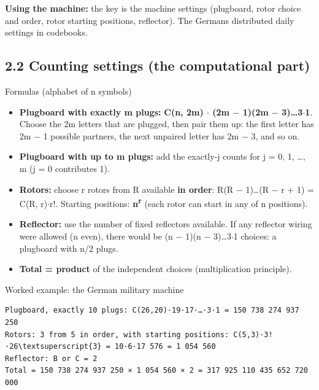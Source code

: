 \documentclass[11pt,a4paper]{article}
\begin{document}
\textbf{Using the machine:} the key is the machine settings (plugboard, rotor choice and order, rotor starting positions, reflector). The Germans distributed daily settings in codebooks.\par
\subsection*{2.2 Counting settings (the computational part)}
\begin{method}{Formulas (alphabet of n symbols)}
\begin{itemize}
\item \textbf{Plugboard with exactly m plugs:} \textbf{C(n, 2m) \ensuremath{\cdot} (2m \ensuremath{-} 1)(2m \ensuremath{-} 3)\ldots{}3\ensuremath{\cdot}1}. Choose the 2m letters that are plugged, then pair them up: the first letter has 2m \ensuremath{-} 1 possible partners, the next unpaired letter has 2m \ensuremath{-} 3, and so on.
\item \textbf{Plugboard with up to m plugs:} add the exactly-j counts for j = 0, 1, \ldots{}, m (j = 0 contributes 1).
\item \textbf{Rotors:} choose r rotors from R available \textbf{in order}: R(R \ensuremath{-} 1)\ldots{}(R \ensuremath{-} r + 1) = C(R, r)\ensuremath{\cdot}r!. Starting positions: \textbf{n\textsuperscript{r}} (each rotor can start in any of n positions).
\item \textbf{Reflector:} use the number of fixed reflectors available. If any reflector wiring were allowed (n even), there would be (n \ensuremath{-} 1)(n \ensuremath{-} 3)\ldots{}3\ensuremath{\cdot}1 choices: a plugboard with n/2 plugs.
\item \textbf{Total = product} of the independent choices (multiplication principle).
\end{itemize}
\end{method}
\begin{example}{Worked example: the German military machine}
\begin{workbox}
\begin{Verbatim}[commandchars=\\\{\},fontsize=\scriptsize]
Plugboard, exactly 10 plugs: C(26,20)·19·17·…·3·1 = 150 738 274 937 250
Rotors: 3 from 5 in order, with starting positions: C(5,3)·3!·26\textsuperscript{3} = 10·6·17 576 = 1 054 560
Reflector: B or C = 2
Total = 150 738 274 937 250 × 1 054 560 × 2 = 317 925 110 435 652 720 000
\end{Verbatim}
\end{workbox}
\end{example}
\end{document}
